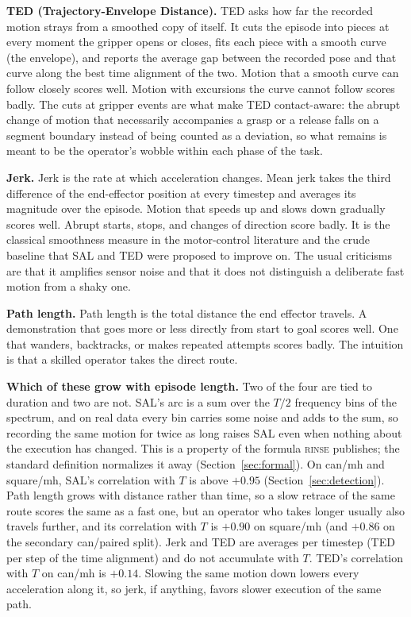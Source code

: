 \documentclass[10pt]{article}
\newcommand{\rinse}{\textmd{\textsc{rinse}}}
\begin{document}
\textbf{TED (Trajectory-Envelope Distance).} TED asks how far the recorded
motion strays from a smoothed copy of itself. It cuts the episode into
pieces at every moment the gripper opens or closes, fits each piece with a
smooth curve (the envelope), and reports the average gap between the
recorded pose and that curve along the best time alignment of the two.
Motion that a smooth curve can follow closely scores well. Motion with
excursions the curve cannot follow scores badly. The cuts at gripper events
are what make TED contact-aware: the abrupt change of motion that
necessarily accompanies a grasp or a release falls on a segment boundary
instead of being counted as a deviation, so what remains is meant to be
the operator's wobble within each phase of the task.

\textbf{Jerk.} Jerk is the rate at which acceleration changes. Mean jerk
takes the third difference of the end-effector position at every timestep
and averages its magnitude over the episode. Motion that speeds up and
slows down gradually scores well. Abrupt starts, stops, and changes of
direction score badly. It is the classical smoothness measure in the
motor-control literature and the crude baseline that SAL and TED were
proposed to improve on. The usual criticisms are that it amplifies sensor
noise and that it does not distinguish a deliberate fast motion from a
shaky one.

\textbf{Path length.} Path length is the total distance the end effector
travels. A demonstration that goes more or less directly from start to goal
scores well. One that wanders, backtracks, or makes repeated attempts
scores badly. The intuition is that a skilled operator takes the direct
route.

\textbf{Which of these grow with episode length.} Two of the four are tied
to duration and two are not. SAL's arc is a sum over the $T/2$ frequency
bins of the spectrum, and on real data every bin carries some noise and
adds to the sum, so recording the same motion for twice as long raises SAL
even when nothing about the execution has changed. This is a property of
the formula \rinse{} publishes; the standard definition normalizes it away
(Section~\ref{sec:formal}). On can/mh and square/mh,
SAL's correlation with $T$ is above $+0.95$ (Section~\ref{sec:detection}).
Path length grows with distance rather than time, so a slow retrace of the
same route scores the same as a fast one, but an operator who takes longer
usually also travels further, and its correlation with $T$ is $+0.90$ on
square/mh (and $+0.86$ on the secondary can/paired split). Jerk and TED are averages per
timestep (TED per step of the time alignment) and do not accumulate with
$T$. TED's correlation with $T$ on can/mh is $+0.14$. Slowing the same
motion down lowers every acceleration along it, so jerk, if anything,
favors slower execution of the same path.
\end{document}
